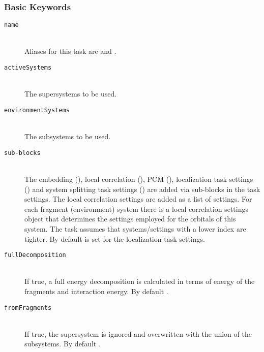\subsubsection{Basic Keywords}
\begin{description}
    \item [\texttt{name}]\hfill \\
    Aliases for this task are  and .
	\item[\texttt{activeSystems}]\hfill \\
	The supersystems to be used.
	\item[\texttt{environmentSystems}]\hfill \\
	The subsystems to be used.
    \item [\texttt{sub-blocks}]\hfill \\
    The embedding (), local correlation (), PCM (), localization task settings () and
    system splitting task settings () are added via sub-blocks in the task settings.
    The local correlation settings are added as a list of settings. For each fragment (environment) system there is
    a local correlation settings object that determines the settings employed for the orbitals of this system. The
    task assumes that systems/settings with a lower index are tighter.
    By default  is set for the localization task settings.
    \item [\texttt{fullDecomposition}]\hfill \\
    If true, a full energy decomposition is calculated in terms of energy of the fragments and interaction energy.
    By default .
    \item [\texttt{fromFragments}]\hfill \\
    If true, the supersystem is ignored and overwritten with the union of the subsystems. By default .
\end{description}
